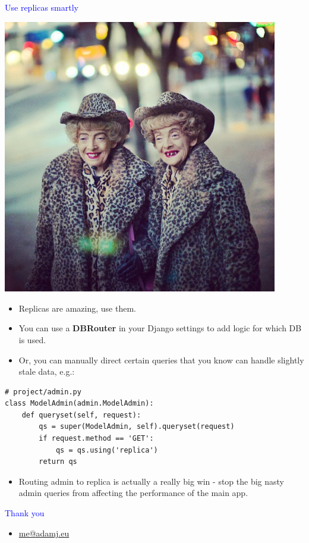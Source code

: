 \documentclass[landscape]{slides}
\begin{document}
\begin{slide}

    \textcolor{blue}{\Large{Use replicas smartly}}

    \begin{center}
        \includegraphics[height=12cm]{Marian_and_Vivian_Brown}
    \end{center}

    \begin{itemize}
        \item Replicas are amazing, use them.
    \end{itemize}

\end{slide}


\begin{slide}

    \begin{itemize}
        \item You can use a \textbf{DBRouter} in your Django settings to add logic for which DB is used.
        \item Or, you can manually direct certain queries that you know can handle slightly stale data, e.g.:
    \end{itemize}

    \begin{lstlisting}
# project/admin.py
class ModelAdmin(admin.ModelAdmin):
    def queryset(self, request):
        qs = super(ModelAdmin, self).queryset(request)
        if request.method == 'GET':
            qs = qs.using('replica')
        return qs
    \end{lstlisting}

    \begin{itemize}
        \item Routing admin to replica is actually a really big win - stop the big nasty admin queries from affecting the performance of the main app.
    \end{itemize}

\end{slide}


\begin{slide}
    \textcolor{blue}{\Large{Thank you}}

    \begin{itemize}
        \item \url{me@adamj.eu}
    \end{itemize}

\end{slide}
\end{document}

